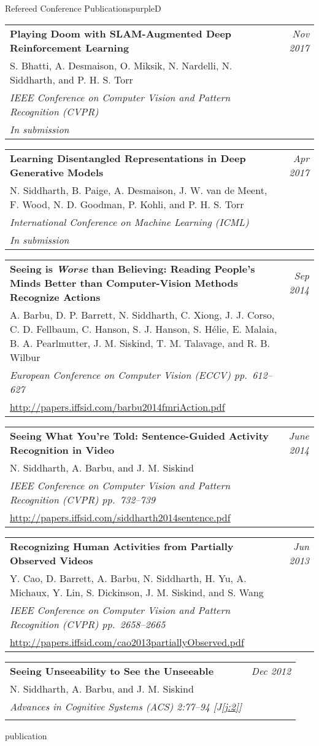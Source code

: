 \documentclass[a4paper]{article}
\makeatletter
\newlength{\itemtextwidth}
\newenvironment{publication}[5]
{ \item
  \begin{tabular*}{\itemtextwidth}{@{}p{5.6in}@{\extracolsep{\fill}}r@{}}
    \textbf{#1} & \textit{#2}\\ #3 &\\ \textit{#4}&\\ #5
  \end{tabular*}
  \vspace*{-2pt}
} {}
\def\item{\addtocounter{enumi}{-2}\oldItem}
\makeatother
\begin{document}
\begin{region}[C][11]{Refereed Conference Publications}{purpleD}
  \begin{publication} {Playing Doom with SLAM-Augmented Deep Reinforcement Learning}
    {Nov 2017}
    {S. Bhatti, A. Desmaison, O. Miksik, N. Nardelli, N. Siddharth, and P. H. S. Torr}
    {IEEE Conference on Computer Vision and Pattern Recognition (CVPR)}
    {\emph{In submission}}
  \end{publication}
  \begin{publication} {Learning Disentangled Representations in Deep Generative Models}
    {Apr 2017}
    {N. Siddharth, B. Paige, A. Desmaison, J. W. van de Meent, F. Wood, N. D.
      Goodman, P. Kohli, and P. H. S. Torr}
    {International Conference on Machine Learning (ICML)}
    {\emph{In submission}}
  \end{publication}
  \begin{publication} {Seeing is \emph{Worse} than Believing: Reading People’s Minds
      Better than Computer-Vision Methods Recognize Actions}
    {Sep 2014}
    {A. Barbu, D. P. Barrett, N. Siddharth, C. Xiong, J. J. Corso, C. D. Fellbaum,
      C. Hanson, S. J. Hanson, S. H\'elie, E. Malaia, B. A. Pearlmutter,
      J. M. Siskind, T. M. Talavage, and R. B. Wilbur}
    {European Conference on Computer Vision (ECCV) \hfill \emph{pp.~612--627}}
    {\url{http://papers.iffsid.com/barbu2014fmriAction.pdf}}
  \end{publication}
  \begin{publication} {Seeing What You're Told: Sentence-Guided Activity Recognition in Video}
    {June 2014}
    {N. Siddharth, A. Barbu, and J. M. Siskind}
    {IEEE Conference on Computer Vision and Pattern Recognition (CVPR) \hfill \emph{pp.~732--739}}
    {\url{http://papers.iffsid.com/siddharth2014sentence.pdf}}
  \end{publication}
  \begin{publication} {Recognizing Human Activities from Partially Observed Videos}
    {Jun 2013}
    {Y. Cao, D. Barrett, A. Barbu, N. Siddharth, H. Yu, A. Michaux, Y. Lin,
      S. Dickinson, J. M. Siskind, and S. Wang}
    {IEEE Conference on Computer Vision and Pattern Recognition (CVPR) \hfill \emph{pp.~2658--2665}}
    {\url{http://papers.iffsid.com/cao2013partiallyObserved.pdf}}
  \end{publication}
  \begin{publication} {Seeing Unseeability to See the Unseeable}
    {Dec 2012}
    {N. Siddharth, A. Barbu, and J. M. Siskind}
    {Advances in Cognitive Systems (ACS) \hfill \emph{2:77--94} [{\color{blueGreen}J\ref{j:2}}]}

\end{publication}
\end{region}
\end{document}
